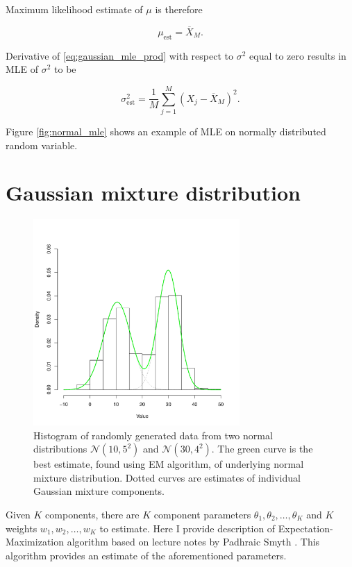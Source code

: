 \documentclass[thesis=B,english]{FITthesis}[2012/06/26]
\begin{document}
Maximum likelihood estimate of $\mu$ is therefore

\begin{equation}
\mu_{\text{est}} = \overline X_M.
\end{equation}

Derivative of \ref{eq:gaussian_mle_prod} with respect to $\sigma^2$ equal to zero results in MLE of $\sigma^2$ to be

\begin{equation}
\sigma^2_{\text{est}} = \frac{1}{M} \sum_{j=1}^{M} {(X_j-\overline X_M)^2}.
\end{equation}

Figure \ref{fig:normal_mle} shows an example of MLE on normally distributed random variable.

\section{Gaussian mixture distribution}

\begin{figure}
	\centering
 	\includegraphics[width=0.7\textwidth]{gaussian_mixture_estimate}
 	\caption{Histogram of randomly generated data from two normal distributions $\mathcal{N}(10,5^2)$ and $\mathcal{N}(30,4^2)$. The green curve is the best estimate, found using EM algorithm, of underlying normal mixture distribution. Dotted curves are estimates of individual Gaussian mixture components.}
 	\label{fig:gaussian_mixture_est}
\end{figure}

Given $K$ components, there are $K$ component parameters $\theta_1, \theta_2, \dots, \theta_K$ and $K$ weights $w_1, w_2, \dots, w_K$ to estimate. Here I provide description of Expectation-Maximization algorithm based on lecture notes by Padhraic Smyth \cite{gaussian-mixture-em}. This algorithm provides an estimate of the aforementioned parameters.
\end{document}
